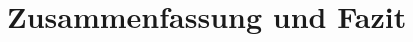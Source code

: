 \documentclass[../Bachelorarbeit.tex]{subfiles}
\begin{document}
\section{Zusammenfassung und Fazit}
\blindtext[1]
\end{document}
